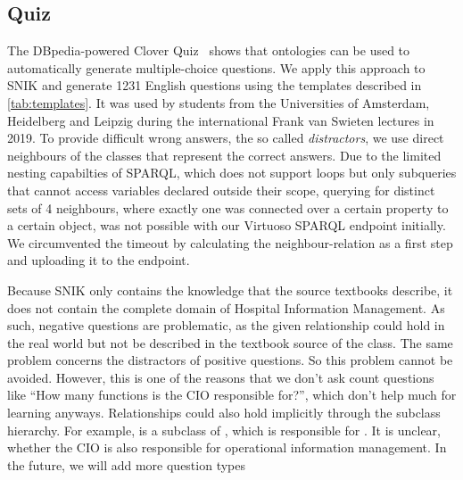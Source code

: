 \documentclass[sw]{iosart2x}
\renewcommand{\citep}{\cite}%
\begin{document}
\subsection{Quiz}
The DBpedia-powered Clover Quiz~\citep{cloverquiz} shows that ontologies can be used to automatically generate multiple-choice questions.
We apply this approach to SNIK and generate 1231 English questions using the templates described in \cref{tab:templates}.
It was used by students from the Universities of Amsterdam, Heidelberg and Leipzig during the international Frank van Swieten lectures in 2019.
To provide difficult wrong answers, the so called \emph{distractors}, we use direct neighbours of the classes that represent the correct answers. 
Due to the limited nesting capabilties of SPARQL, which does not support loops but only subqueries that cannot access variables declared outside their scope, querying for distinct sets of 4 neighbours, where exactly one was connected over a certain property to a certain object, was not possible with our Virtuoso SPARQL endpoint initially.
We circumvented the timeout by calculating the neighbour-relation as a first step and uploading it to the endpoint.

Because SNIK only contains the knowledge that the source textbooks describe, it does not contain the complete domain of Hospital Information Management.
As such, negative questions are problematic, as the given relationship could hold in the real world but not be described in the textbook source of the class. 
The same problem concerns the distractors of positive questions.
So this problem cannot be avoided.
However, this is one of the reasons that we don't ask count questions like \enquote{How many functions is the CIO responsible for?}, which don't help much for learning anyways. %
Relationships could also hold implicitly through the subclass hierarchy.
For example,  is a subclass of , which is responsible for .
It is unclear, whether the CIO is also responsible for operational information management.
In the future, we will add more question types 
\end{document}
